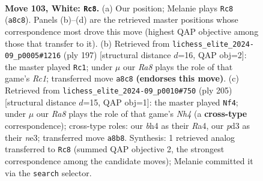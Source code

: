 \documentclass[11pt]{article}
\begin{document}
\clearpage

\begin{figure}[p]\centering
\begin{subfigure}{0.46\textwidth}\centering
\resizebox{\linewidth}{!}{%
\newchessgame
\chessboard[
  setfen={R7/6rn/7p/4p2k/7b/1K1p4/8/8 w - - 2 103},
  showmover=false,
  pgfstyle=straightmove, color=movearrow, markmove={a8-c8}
]}
\caption{}
\end{subfigure}\hfill
\begin{subfigure}{0.46\textwidth}\centering
\resizebox{\linewidth}{!}{%
\newchessgame
\chessboard[
  setfen={2r5/4k3/1R4P1/4K2p/4B2P/8/8/8 b - - 2 99},
  showmover=false,
  pgfstyle=straightmove, color=movearrow, markmove={c8-c1}
]}
\caption{}
\end{subfigure}
\\[4pt]
\begin{subfigure}{0.46\textwidth}\centering
\resizebox{\linewidth}{!}{%
\newchessgame
\chessboard[
  setfen={8/8/4k3/7n/r7/4NP2/1R3K2/8 b - - 76 103},
  showmover=false,
  pgfstyle=straightmove, color=movearrow, markmove={h5-f4}
]}
\caption{}
\end{subfigure}\hfill

\caption{\textbf{Move 103, White: \texttt{Rc8}.} (a) Our position; Melanie plays \texttt{Rc8} (\texttt{a8c8}). Panels (b)--(d) are the retrieved master positions whose correspondence most drove this move (highest QAP objective among those that transfer to it). (b) Retrieved from \texttt{lichess\_elite\_2024-09\_p0005\#1216} (ply 197) [structural distance $d$=16, QAP obj=2]: the master played \texttt{Rc1}; under $\mu$ our \emph{Ra8} plays the role of that game's \emph{Rc1}; transferred move \texttt{a8c8} \textbf{(endorses this move)}. (c) Retrieved from \texttt{lichess\_elite\_2024-09\_p0010\#750} (ply 205) [structural distance $d$=15, QAP obj=1]: the master played \texttt{Nf4}; under $\mu$ our \emph{Ra8} plays the role of that game's \emph{Nh4} (a \textbf{cross-type} correspondence); cross-type roles: our \emph{b}h4 as their \emph{R}a4, our \emph{p}d3 as their \emph{n}e3; transferred move \texttt{a8b8}. Synthesis: 1 retrieved analog transferred to \texttt{Rc8} (summed QAP objective 2, the strongest correspondence among the candidate moves); Melanie committed it via the \texttt{search} selector.}
\label{fig:thought-m204}
\end{figure}

\clearpage
\end{document}
